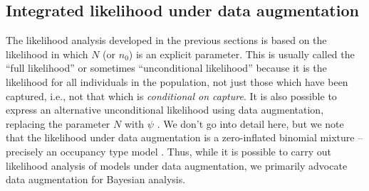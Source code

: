 \begin{comment}

\subsection{Exercises}

{\flushleft 
{\bf 1.}	
Run the analysis with different state-space buffers and comment on the result. 
}


{\flushleft 
{\bf 2.} Conduct a brief simulation study using this code by
  simulating 100 data sets and obtain the MLEs for each data set. Do
  things seem to be working as you expect?  }

{\flushleft 
{\bf 3.} 
Further extensions: It should be straightforward to
  generalize the integrated likelihood function to accommodate many
  different situations. For examples, if we want to include more
  covariates in the model we can just add stuff to the object \mbox{\tt probcap},
 and add the relevant parameters to the argument that gets
  passed to the main  function.  For the simulated data, make up a
  covariate by generating a Bernoulli covariate (``trap type'', perhaps
  baited or not baited) randomly and try to modify the likelihood to
  accommodate that.  }

{\flushleft {\bf 4.}  We would probably be interested in devising the
  integrated likelihood for the full 3-d encounter history array so
  that we could include temporally varying covariates. This is not
  difficult but naturally will slow down the execution
  substantially. The interested reader should try to expand the
  capabilities of this basic {\bf R} function.  }
\end{comment}




\subsection{Integrated likelihood  under data augmentation } 
\label{mle.sec.intlikDA}

The likelihood analysis developed in the previous sections
is based on the likelihood
in which $N$ (or $n_{0}$) is an explicit parameter. This is usually called
the ``full likelihood'' or sometimes ``unconditional likelihood''
\citep{borchers_etal:2002} because it is the likelihood for all
individuals in the population, not just those which have been
captured, i.e., not that which is {\it conditional on capture}.
It is also possible to 
express an alternative unconditional  likelihood using data augmentation, replacing the
parameter $N$ with $\psi$ \citep[e.g., see Sec. 7.1.6][for an example]{royle_dorazio:2008}.
We don't go into detail here, but we note that the
likelihood under data augmentation is a zero-inflated binomial
mixture -- precisely an occupancy type model \citep{royle:2006}.
Thus, while it is possible to carry out likelihood analysis of
models under data augmentation, we primarily advocate data
augmentation for Bayesian analysis.


